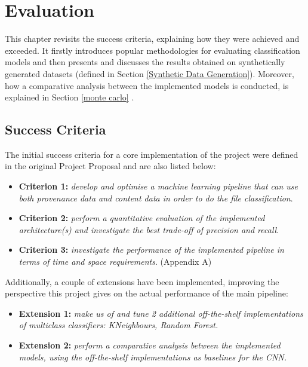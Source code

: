 

\chapter{Evaluation}

This chapter revisits the success criteria, explaining how they were achieved and exceeded. It firstly introduces popular methodologies for evaluating classification models and then presents and discusses the results obtained on synthetically generated datasets (defined in Section \ref{Synthetic Data Generation}). Moreover, how a comparative analysis between the implemented models is conducted, is explained in Section \ref{monte carlo} . 


\section{Success Criteria}

The initial success criteria for a core implementation of the project were defined in the original Project Proposal and are also listed below:

\begin{itemize}
  \item \textbf{Criterion 1:} \textit{develop and optimise a machine learning pipeline that can use both provenance data and content data in order to do the file classification}. \greencheck

  \item \textbf{Criterion 2:} \textit{perform a quantitative evaluation of the implemented architecture(s) and investigate the best trade-off of precision and recall}. \greencheck

  \item \textbf{Criterion 3:} \textit{investigate the performance of the implemented pipeline in terms of time and space requirements}. (Appendix A) \greencheck

\end{itemize}

Additionally, a couple of extensions have been implemented, improving the perspective this project gives on the actual performance of the main pipeline:

\begin{itemize}
  \item \textbf{Extension 1:} \textit{make us of and tune 2 additional off-the-shelf implementations of multiclass classifiers: KNeighbours, Random Forest.} \greencheck

  \item \textbf{Extension 2:} \textit{perform a comparative analysis between the implemented models, using the off-the-shelf implementations as baselines for the CNN.} \greencheck

\end{itemize}


